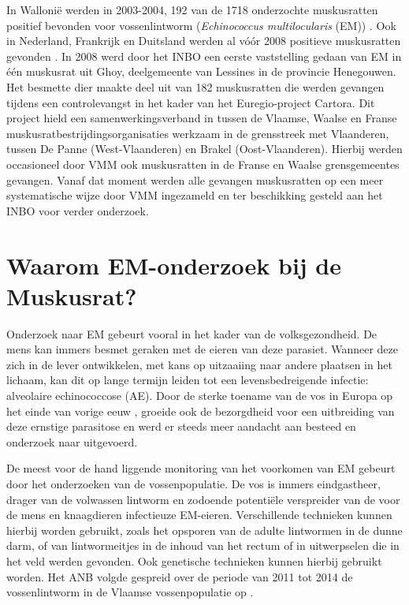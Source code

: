 \documentclass[twoside]{extreport}
\begin{document}
In Wallonië werden in 2003-2004, 192 van de 1718 onderzochte
muskusratten positief bevonden voor vossenlintworm (\emph{Echinococcus
multilocularis} (EM)) \citep{hanosset2008echinococcus}. Ook in
Nederland, Frankrijk en Duitsland werden al vóór 2008 positieve
muskusratten gevonden \citep{oksanen2016geographical}. In 2008 werd door
het INBO een eerste vaststelling gedaan van EM in één muskusrat uit
Ghoy, deelgemeente van Lessines in de provincie Henegouwen. Het besmette
dier maakte deel uit van 182 muskusratten die werden gevangen tijdens
een controlevangst in het kader van het Euregio-project Cartora. Dit
project hield een samenwerkingsverband in tussen de Vlaamse, Waalse en
Franse muskusratbestrijdingsorganisaties werkzaam in de grensstreek met
Vlaanderen, tussen De Panne (West-Vlaanderen) en Brakel
(Oost-Vlaanderen). Hierbij werden occasioneel door VMM ook muskusratten
in de Franse en Waalse grensgemeentes gevangen. Vanaf dat moment werden
alle gevangen muskusratten op een meer systematische wijze door VMM
ingezameld en ter beschikking gesteld aan het INBO voor verder
onderzoek.

\section{Waarom EM-onderzoek bij de
Muskusrat?}\label{waarom-em-onderzoek-bij-de-muskusrat}

Onderzoek naar EM gebeurt vooral in het kader van de volksgezondheid. De
mens kan immers besmet geraken met de eieren van deze parasiet. Wanneer
deze zich in de lever ontwikkelen, met kans op uitzaaiing naar andere
plaatsen in het lichaam, kan dit op lange termijn leiden tot een
levensbedreigende infectie: alveolaire echinococcose (AE). Door de
sterke toename van de vos in Europa op het einde van vorige eeuw
\citep{vandenberge2003vos, vandenberge2013stadsvos}, groeide ook de
bezorgdheid voor een uitbreiding van deze ernstige parasitose
\citep{eckert2001oie, eckert2004biological} en werd er steeds meer
aandacht aan besteed en onderzoek naar uitgevoerd.

De meest voor de hand liggende monitoring van het voorkomen van EM
gebeurt door het onderzoeken van de vossenpopulatie. De vos is immers
eindgastheer, drager van de volwassen lintworm en zodoende potentiële
verspreider van de voor de mens en knaagdieren infectieuze EM-eieren.
Verschillende technieken kunnen hierbij worden gebruikt, zoals het
opsporen van de adulte lintwormen in de dunne darm, of van
lintwormeitjes in de inhoud van het rectum of in uitwerpselen die in het
veld werden gevonden. Ook genetische technieken kunnen hierbij gebruikt
worden. Het ANB volgde gespreid over de periode van 2011 tot 2014 de
vossenlintworm in de Vlaamse vossenpopulatie op
\citep{vervaeke2012vossenlintworm, vervaeke2014geen, vervaeke2014bis}.
\end{document}
